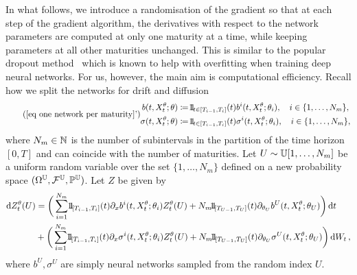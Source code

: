 In what follows, we introduce a randomisation of the gradient so that at each step of the gradient algorithm, the derivatives with respect to the network parameters are computed at only one maturity at a time, while keeping parameters at all other maturities unchanged. This is similar to the popular dropout method~\cite{Srivastava2014Dropout:Overfitting} which is known to help with overfitting when training deep neural networks. For us, however, the main aim is computational efficiency.
Recall how we split the networks for drift and diffusion %
\begin{equation} 
\tag{\ref{eq one network per maturity}'}
\begin{split}
b(t,X_t^{\theta};\theta) & \defEqual  \ind_{t\in[T_{i-1},T_i]}(t)b^i(t,X_t^{\theta};\theta_i), \quad i\in\{1,\ldots,N_{m}\},	\\
\sigma(t,X_t^{\theta};\theta) & \defEqual  \ind_{t\in[T_{i-1},T_i]}(t)\sigma^i(t,X_t^{\theta};\theta_i), \quad i\in\{1,\ldots,N_{m}\},	
\end{split}
\end{equation}
where $N_m\in\mathbb{N}$ is the number of subintervals in the partition of the time horizon $[0,T]$ and can coincide with the number of maturities. Let $U\sim \mathbb{U}[1,\ldots,N_{m}]$ be a uniform random variable over the set $\{1,\ldots, N_{m}\}$ defined on a new probability space $( \Omega^{\mathbb{U}}, \mathcal{F}^{\mathbb{U}},\mathbb{P}^{\mathbb{U}})$. 
Let $Z$ be given by 
\begin{equation}
\label{eq rand train Z}
\begin{split}
\D Z_t^{\theta}(U) &= \bigg(\sum_{i=1}^{N_{m}} \ind_{[T_{i-1},T_i]}(t) \partial_x b^i(t,X_t^{\theta};\theta_i) Z_t^{\theta}(U)   +  N_m \ind_{[T_{U-1},T_U]}(t) \partial_{\theta_{U}} b^{U}(t,X_t^{\theta};\theta_{U}) \bigg)\, \D t \\  
& + \bigg(\sum_{i=1}^{N_{m}} \ind_{[T_{i-1},T_i]}(t)\partial_x \sigma^i(t,X_t^{\theta};\theta_i) Z_t^{\theta}(U)   +  N_m \ind_{[T_{U-1},T_U]}(t) \partial_{\theta_{U}} \sigma^{U}(t,X_t^{\theta};\theta_{U}) \bigg)\, \D W_t \,, 
\end{split}
\end{equation}
where $b^U,\sigma^U$ are simply neural networks sampled from the random index $U$.


